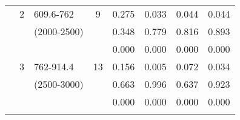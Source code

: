 \begin{table}[p]
\begin{tabular}{cclcllll}
                                                               &  2                                                             & 609.6-762                                                              & 9                                                                     & 0.275                                       & 0.033                                           & 0.044                                              & 0.044  \\ 
                                                               &                                                                 & (2000-2500)                                                           &                                                                        & 0.348                                       & 0.779                                           & 0.816                                              & 0.893  \\ 
                                                               &                                                                 &                                                                                &                                                                        &  0.000                                      & 0.000                                           & 0.000                                              & 0.000  \\ \cline{5-8}\noalign{\smallskip}
                                                               &  3                                                             & 762-914.4                                                              & 13                                                                   &  0.156                                      & 0.005                                           & 0.072                                              & 0.034  \\ 
                                                               &                                                                 & (2500-3000)                                                           &                                                                        &  0.663                                      & 0.996                                           & 0.637                                              & 0.923  \\ 
                                                               &                                                                 &                                                                                &                                                                        & 0.000                                       & 0.000                                           & 0.000                                               & 0.000  \\ \cline{5-8}\noalign{\smallskip}

\end{tabular}
\end{table}
